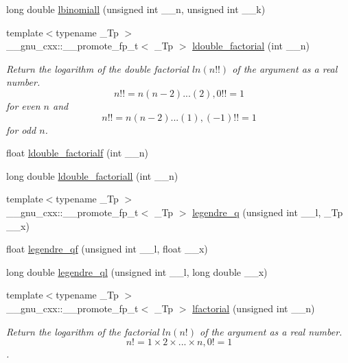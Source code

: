 \begin{DoxyCompactItemize}
\item 
long double \hyperlink{group__gnu__math__spec__func_ga20e6c250e10e20b9e2c3f68bf9a3d4c1}{lbinomiall} (unsigned int \+\_\+\+\_\+n, unsigned int \+\_\+\+\_\+k)
\item 
{\footnotesize template$<$typename \+\_\+\+Tp $>$ }\\\+\_\+\+\_\+gnu\+\_\+cxx\+::\+\_\+\+\_\+promote\+\_\+fp\+\_\+t$<$ \+\_\+\+Tp $>$ \hyperlink{group__gnu__math__spec__func_ga31ca8e7a5b1f5c883e727ed9c053edd8}{ldouble\+\_\+factorial} (int \+\_\+\+\_\+n)
\begin{DoxyCompactList}\small\item\em Return the logarithm of the double factorial $ ln(n!!) $ of the argument as a real number. \[ n!! = n(n-2)...(2), 0!! = 1 \] for even $ n $ and \[ n!! = n(n-2)...(1), (-1)!! = 1 \] for odd $ n $. \end{DoxyCompactList}\item 
float \hyperlink{group__gnu__math__spec__func_ga33ecc59a7ff139b483cebf42ecd4fe79}{ldouble\+\_\+factorialf} (int \+\_\+\+\_\+n)
\item 
long double \hyperlink{group__gnu__math__spec__func_gae8fa4b4866cfd20349c985b33ed2936e}{ldouble\+\_\+factoriall} (int \+\_\+\+\_\+n)
\item 
{\footnotesize template$<$typename \+\_\+\+Tp $>$ }\\\+\_\+\+\_\+gnu\+\_\+cxx\+::\+\_\+\+\_\+promote\+\_\+fp\+\_\+t$<$ \+\_\+\+Tp $>$ \hyperlink{group__gnu__math__spec__func_ga4ad68133a4ff354cb99e4d3608ce6e4d}{legendre\+\_\+q} (unsigned int \+\_\+\+\_\+l, \+\_\+\+Tp \+\_\+\+\_\+x)
\item 
float \hyperlink{group__gnu__math__spec__func_ga46cf4d58886af402c6776bc090b4e4a7}{legendre\+\_\+qf} (unsigned int \+\_\+\+\_\+l, float \+\_\+\+\_\+x)
\item 
long double \hyperlink{group__gnu__math__spec__func_ga60feac5a8bd733abee6610adf15208f2}{legendre\+\_\+ql} (unsigned int \+\_\+\+\_\+l, long double \+\_\+\+\_\+x)
\item 
{\footnotesize template$<$typename \+\_\+\+Tp $>$ }\\\+\_\+\+\_\+gnu\+\_\+cxx\+::\+\_\+\+\_\+promote\+\_\+fp\+\_\+t$<$ \+\_\+\+Tp $>$ \hyperlink{group__gnu__math__spec__func_gaee28cc03db944a3e02fd10542016cfa8}{lfactorial} (unsigned int \+\_\+\+\_\+n)
\begin{DoxyCompactList}\small\item\em Return the logarithm of the factorial $ ln(n!) $ of the argument as a real number. \[ n! = 1 \times 2 \times ... \times n, 0! = 1 \]. \end{DoxyCompactList}\item 

\end{DoxyCompactItemize}
